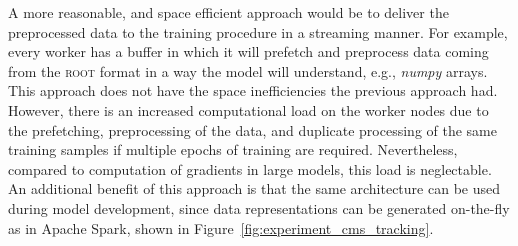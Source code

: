 A more reasonable, and space efficient approach would be to deliver the preprocessed data to the training procedure in a streaming manner. For example, every worker has a buffer in which it will prefetch and preprocess data coming from the \textsc{root} format in a way the model will understand, e.g., \emph{numpy} arrays. This approach does not have the space inefficiencies the previous approach had. However, there is an increased computational load on the worker nodes due to the prefetching, preprocessing of the data, and duplicate processing of the same training samples if multiple epochs of training are required. Nevertheless, compared to computation of gradients in large models, this load is neglectable. An additional benefit of this approach is that the same architecture can be used during model development, since data representations can be generated on-the-fly as in Apache Spark, shown in Figure~\ref{fig:experiment_cms_tracking}.

